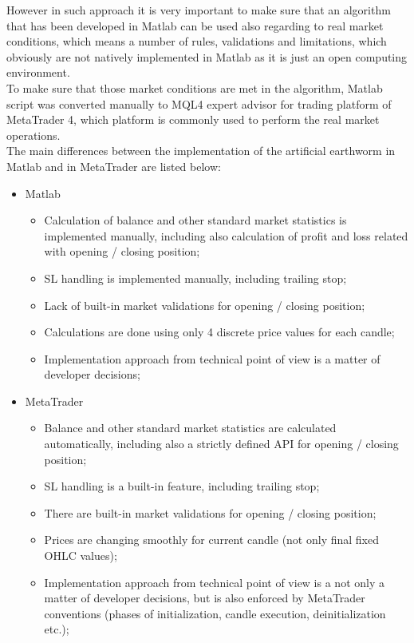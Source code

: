 \documentclass[runningheads,a4paper]{llncs}
\begin{document}
However in such approach it is very important to make sure that an algorithm that has been developed in Matlab can be used also regarding to real market conditions, which means a number of rules, validations and limitations, which obviously are not natively implemented in Matlab as it is just an open computing environment.\\

To make sure that those market conditions are met in the algorithm, Matlab script was converted manually to MQL4 expert advisor for trading platform of MetaTrader 4, which platform is commonly used to perform the real market operations.\\

The main differences between the implementation of the artificial earthworm in Matlab and in MetaTrader are listed below:
\begin{itemize}
\item Matlab
\begin{itemize}
\item Calculation of balance and other standard market statistics is implemented manually, including also calculation of profit and loss related with opening / closing position;
\item SL handling is implemented manually, including trailing stop;
\item Lack of built-in market validations for opening / closing position;
\item Calculations are done using only 4 discrete price values for each candle;
\item Implementation approach from technical point of view is a matter of developer decisions;
\end{itemize}
\item MetaTrader
\begin{itemize}
\item Balance and other standard market statistics are calculated automatically, including also a strictly defined API for opening / closing position;
\item SL handling is a built-in feature, including trailing stop;
\item There are built-in market validations for opening / closing position;
\item Prices are changing smoothly for current candle (not only final fixed OHLC values);
\item Implementation approach from technical point of view is a not only a matter of developer decisions, but is also enforced by MetaTrader conventions (phases of initialization, candle execution, deinitialization etc.);
\end{itemize}
\end{itemize}
\end{document}
